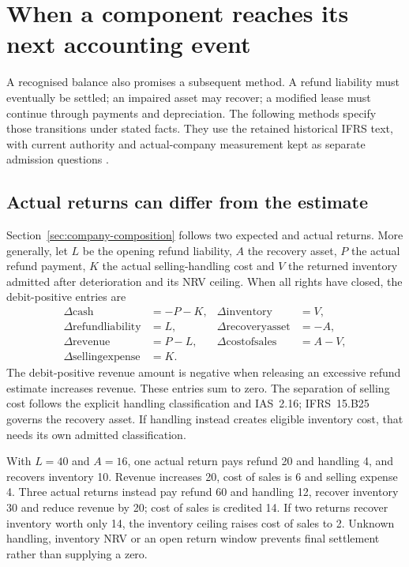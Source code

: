 \section{When a component reaches its next accounting event}
\label{sec:corporate-residual-transitions}

A recognised balance also promises a subsequent method. A refund liability
must eventually be settled; an impaired asset may recover; a modified lease
must continue through payments and depreciation. The following methods specify
those transitions under stated facts. They use the retained historical
IFRS text, with current authority and actual-company measurement kept as
separate admission questions \citep{eu20231803}.

\subsection{Actual returns can differ from the estimate}

Section~\ref{sec:company-composition} follows two expected and actual returns.
More generally, let \(L\) be the opening refund liability, \(A\) the recovery
asset, \(P\) the actual refund payment, \(K\) the actual selling-handling cost
and \(V\) the returned inventory admitted after deterioration and its NRV
ceiling. When all rights have closed, the debit-positive entries are
\begin{align}
 \Delta\mathrm{cash}&=-P-K,&
 \Delta\mathrm{inventory}&=V,\\
 \Delta\mathrm{refund liability}&=L,&
 \Delta\mathrm{recovery asset}&=-A,\\
 \Delta\mathrm{revenue}&=P-L,&
 \Delta\mathrm{cost of sales}&=A-V,\\
 \Delta\mathrm{selling expense}&=K.
\end{align}
The debit-positive revenue amount is negative when releasing an excessive
refund estimate increases revenue. These entries sum to zero. The separation
of selling cost follows the explicit handling classification and IAS~2.16;
IFRS~15.B25 governs the recovery asset. If handling instead creates eligible
inventory cost, that needs its own admitted classification.

With \(L=40\) and \(A=16\), one actual return pays refund 20 and handling 4,
and recovers inventory 10. Revenue increases 20, cost of sales is 6 and selling
expense 4. Three actual returns instead pay refund 60 and handling 12, recover
inventory 30 and reduce revenue by 20; cost of sales is credited 14. If two
returns recover inventory worth only 14, the inventory ceiling raises cost of
sales to 2. Unknown handling, inventory NRV or an open return window prevents
final settlement rather than supplying a zero.

